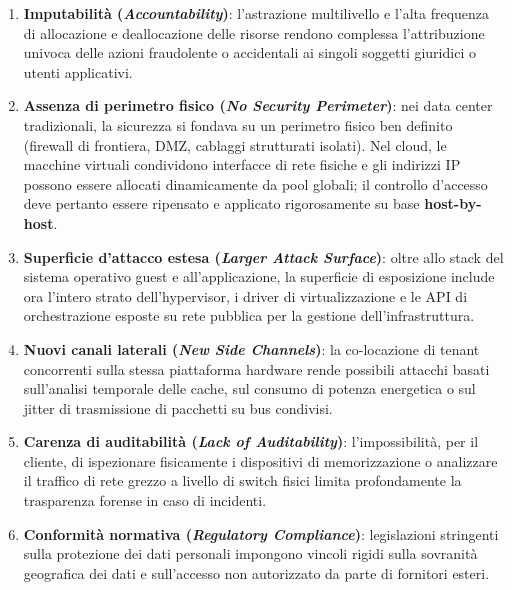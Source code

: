 \documentclass[11pt, a4paper]{article}
\begin{document}
\begin{enumerate}
    \item \textbf{Imputabilità (\emph{Accountability})}: l'astrazione multilivello e l'alta frequenza di allocazione e deallocazione delle risorse rendono complessa l'attribuzione univoca delle azioni fraudolente o accidentali ai singoli soggetti giuridici o utenti applicativi.
    \item \textbf{Assenza di perimetro fisico (\emph{No Security Perimeter})}: nei data center tradizionali, la sicurezza si fondava su un perimetro fisico ben definito (firewall di frontiera, DMZ, cablaggi strutturati isolati). Nel cloud, le macchine virtuali condividono interfacce di rete fisiche e gli indirizzi IP possono essere allocati dinamicamente da pool globali; il controllo d'accesso deve pertanto essere ripensato e applicato rigorosamente su base \textbf{host-by-host}.


    \item \textbf{Superficie d'attacco estesa (\emph{Larger Attack Surface})}: oltre allo stack del sistema operativo guest e all'applicazione, la superficie di esposizione include ora l'intero strato dell'hypervisor, i driver di virtualizzazione e le API di orchestrazione esposte su rete pubblica per la gestione dell'infrastruttura.
    \item \textbf{Nuovi canali laterali (\emph{New Side Channels})}: la co-locazione di tenant concorrenti sulla stessa piattaforma hardware rende possibili attacchi basati sull'analisi temporale delle cache, sul consumo di potenza energetica o sul jitter di trasmissione di pacchetti su bus condivisi.
    \item \textbf{Carenza di auditabilità (\emph{Lack of Auditability})}: l'impossibilità, per il cliente, di ispezionare fisicamente i dispositivi di memorizzazione o analizzare il traffico di rete grezzo a livello di switch fisici limita profondamente la trasparenza forense in caso di incidenti.
    \item \textbf{Conformità normativa (\emph{Regulatory Compliance})}: legislazioni stringenti sulla protezione dei dati personali impongono vincoli rigidi sulla sovranità geografica dei dati e sull'accesso non autorizzato da parte di fornitori esteri.
\end{enumerate}
\end{document}
